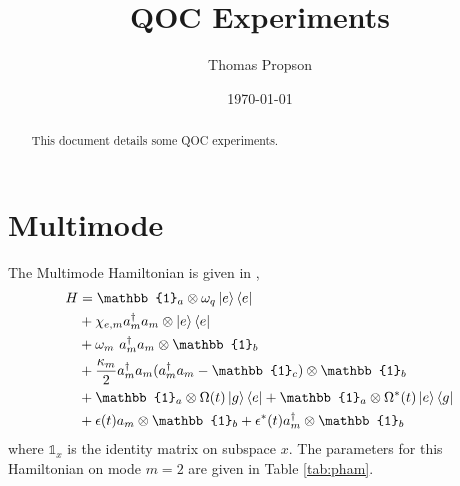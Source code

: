 \documentclass[
  amsfonts,
  amsmath,
  tbtags,
  amssymb,
  aps,
  nobibnotes,
  twocolumn,
  superscriptaddress,
]{revtex4-2}
\begin{document}
\title{QOC Experiments}

\author{Thomas Propson}

\date{\today}

\begin{abstract}
  This document details some QOC experiments.
\end{abstract}

\maketitle

\section{Multimode}
The Multimode Hamiltonian is given in \cite{chakram2020multimode},
\begin{align*}
  H &=  \mathbb{1}_{a} \otimes \omega_{q} \ket{e}\bra{e}\\
  &+ \chi_{e,m} a_{m}^{\dagger}a_{m} \otimes \ket{e}\bra{e}\\
  &+ \omega_{m} \ a_{m}^{\dagger}a_{m} \otimes \mathbb{1}_{b}\\
  &+ \frac{\kappa_{m}}{2} a_{m}^{\dagger} a_{m} (a_{m}^{\dagger}a_{m} - \mathbb{1}_{c}) \otimes \mathbb{1}_{b}\\
  &+ \mathbb{1}_{a} \otimes \Omega(t) \ket{g}\bra{e} +
  \mathbb{1}_{a} \otimes \Omega^{*}(t) \ket{e}\bra{g}\\
  &+ \epsilon(t) a_{m} \otimes \mathbb{1}_{b} + 
  \epsilon^{*}(t) a_{m}^{\dagger} \otimes \mathbb{1}_{b}
\end{align*}
where $\mathbb{1}_{x}$ is the identity matrix
on subspace $x$. The parameters for this Hamiltonian on mode $m = 2$
are given in Table \ref{tab:pham}.
\end{document}

